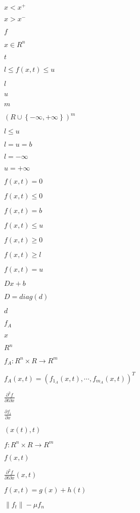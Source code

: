 \documentclass{article}
\begin{document}
$ x<x^+ $
\pagebreak

$ x>x^- $
\pagebreak

$ f $
\pagebreak

$ x \in R^n $
\pagebreak

$ t $
\pagebreak

$ l \le f(x,t) \le u $
\pagebreak

$ l $
\pagebreak

$ u $
\pagebreak

$ m $
\pagebreak

$ \left(R\cup\left\{-\infty,+\infty\right\}\right)^m $
\pagebreak

$ l \le u $
\pagebreak

$ l = u = b $
\pagebreak

$ l = -\infty $
\pagebreak

$ u = +\infty $
\pagebreak

$ f(x,t) = 0 $
\pagebreak

$ f(x,t) \le 0 $
\pagebreak

$ f(x,t) = b $
\pagebreak

$ f(x,t) \le u $
\pagebreak

$ f(x,t) \ge 0 $
\pagebreak

$ f(x,t) \ge l $
\pagebreak

$ f(x,t) = u $
\pagebreak

$ Dx+b $
\pagebreak

$ D=diag(d) $
\pagebreak

$ d $
\pagebreak

$ f_A $
\pagebreak

$x$
\pagebreak

$R^n$
\pagebreak

$ f_A : R^n \times R \rightarrow R^m $
\pagebreak

$ f_A(x,t) = (f_{1_A}(x,t), \cdots, f_{m_A}(x,t))^T $
\pagebreak

$ \frac{\partial^2 f}{\partial t \partial x}$
\pagebreak

$ \frac{\partial f_i}{\partial x}$
\pagebreak

$ \left(x(t),t\right) $
\pagebreak

$ f: R^n \times R \rightarrow R^m $
\pagebreak

$ f(x,t) $
\pagebreak

$ \frac{\partial^2 f}{\partial t \partial x}(x,t) $
\pagebreak

$ f(x,t) = g(x)+h(t)$
\pagebreak

$ \left\|f_t\right\| - \mu f_n $
\pagebreak
\end{document}
